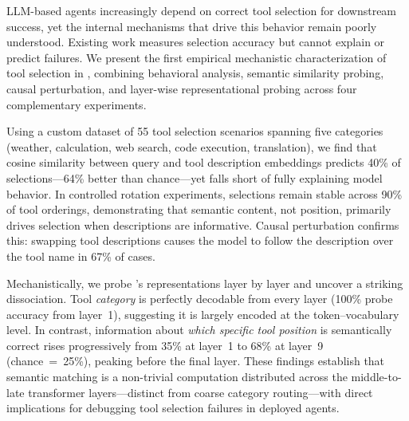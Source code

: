 LLM-based agents increasingly depend on correct tool selection for downstream success, yet
the internal mechanisms that drive this behavior remain poorly understood.
Existing work measures selection accuracy but cannot explain or predict failures.
We present the first empirical mechanistic characterization of tool selection in \LLMs,
combining behavioral analysis, semantic similarity probing, causal perturbation, and
layer-wise representational probing across four complementary experiments.

Using a custom dataset of 55 tool selection scenarios spanning five categories
(weather, calculation, web search, code execution, translation),
we find that cosine similarity between query and tool description embeddings predicts
40\% of selections---64\% better than chance---yet falls short of fully explaining model
behavior.  In controlled rotation experiments, selections remain stable across 90\% of
tool orderings, demonstrating that semantic content, not position, primarily drives
selection when descriptions are informative.  Causal perturbation confirms this:
swapping tool descriptions causes the model to follow the description over the tool name
in 67\% of cases.

Mechanistically, we probe \gpttwo{}'s representations layer by layer and uncover a
striking dissociation.  Tool \emph{category} is perfectly decodable from every layer
(100\% probe accuracy from layer~1), suggesting it is largely encoded at the
token--vocabulary level.  In contrast, information about \emph{which specific tool
position} is semantically correct rises progressively from 35\% at layer~1 to 68\% at
layer~9 (chance~=~25\%), peaking before the final layer.  These findings establish that
semantic matching is a non-trivial computation distributed across the middle-to-late
transformer layers---distinct from coarse category routing---with direct implications for
debugging tool selection failures in deployed agents.
